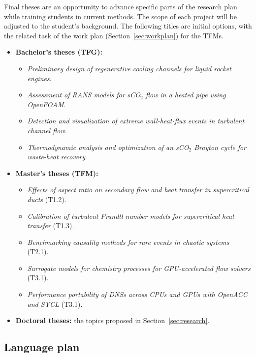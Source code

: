 \documentclass[11pt]{article}
\newcommand{\NEW}[1]{\iffinal #1\else{\color{red}#1}\fi}
\begin{document}
Final theses are an opportunity to advance specific parts of the research plan while training students in current methods. 
The scope of each project will be adjusted to the student's background. 
The following titles are initial options, with the related task of the work plan (Section~\ref{sec:workplan}) for the TFMs.
\begin{itemize}
  \item \textbf{Bachelor's theses (TFG):}
  \begin{itemize}
    \item \emph{Preliminary design of regenerative cooling channels for liquid rocket engines}.
    \item \emph{Assessment of RANS models for sCO$_2$ flow in a heated pipe using OpenFOAM}.
    \item \emph{Detection and visualization of extreme wall-heat-flux events in turbulent channel flow}.
    \item \emph{Thermodynamic analysis and optimization of \NEW{an} sCO$_2$ Brayton cycle for waste-heat recovery}.
  \end{itemize}
  \item \textbf{Master's theses (TFM):}
  \begin{itemize}
    \item \emph{Effects of aspect ratio on secondary flow and heat transfer in supercritical ducts} (T1.2).
    \item \emph{Calibration of turbulent Prandtl number models for supercritical heat transfer} (T1.3).
    \item \emph{Benchmarking causality methods for rare events in chaotic systems} (T2.1).
    \item \emph{Surrogate models for chemistry processes for GPU-accelerated flow solvers} (T3.1).
    \item \emph{Performance portability of DNSs across CPUs and GPUs with OpenACC and SYCL} (T3.1).
  \end{itemize}
  \item \textbf{Doctoral theses:} the topics proposed in Section~\ref{sec:research}.
\end{itemize}

\subsection{Language plan}
\end{document}
